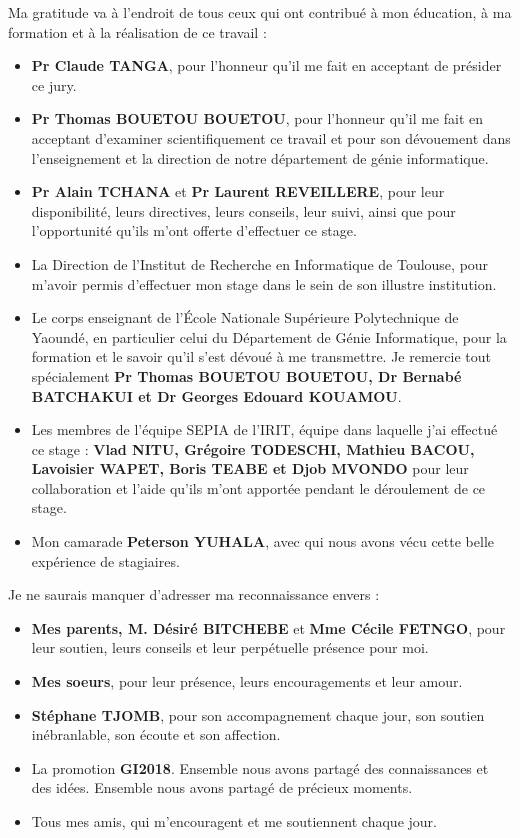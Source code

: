 \begin{SingleSpace}
Ma gratitude va à l'endroit de tous ceux qui ont contribué à mon éducation, à ma formation et à la réalisation de ce travail :

\begin{itemize}
	\item \textbf{Pr Claude TANGA}, pour l’honneur qu’il me fait en acceptant de présider ce jury.
    \item \textbf{Pr Thomas BOUETOU BOUETOU}, pour l’honneur qu’il me fait en acceptant d’examiner scientifiquement ce travail et pour son dévouement dans l'enseignement et la direction de notre département de génie informatique.
    \item \textbf{Pr Alain TCHANA} et \textbf{Pr Laurent REVEILLERE}, pour leur disponibilité, leurs directives, leurs conseils, leur suivi, ainsi que pour l’opportunité qu’ils m’ont offerte d’effectuer ce stage.
    \item La Direction de l’Institut de Recherche en Informatique de Toulouse, pour m’avoir permis d’effectuer mon stage dans le sein de son illustre institution.
    \item Le corps enseignant de l’École Nationale Supérieure Polytechnique de Yaoundé, en particulier celui du Département de Génie Informatique, pour la formation et le savoir qu’il s’est dévoué à me transmettre. Je remercie tout spécialement \textbf{Pr Thomas BOUETOU BOUETOU, Dr Bernabé BATCHAKUI et Dr Georges Edouard KOUAMOU}.
    \item Les membres de l’équipe SEPIA de l’IRIT, équipe dans laquelle j’ai effectué ce \break stage : \textbf{Vlad NITU, Grégoire TODESCHI, Mathieu BACOU, Lavoisier WAPET, Boris TEABE et Djob MVONDO} pour leur collaboration et l’aide qu’ils m’ont apportée pendant le déroulement de ce stage.
    \item Mon camarade \textbf{Peterson YUHALA}, avec qui nous avons vécu cette belle expérience de stagiaires.
\end{itemize}

\noindent Je ne saurais manquer d'adresser ma reconnaissance envers : 
\begin{itemize}
	\item \textbf{Mes parents, M. Désiré BITCHEBE} et \textbf{Mme Cécile FETNGO}, pour leur soutien, leurs conseils et leur perpétuelle présence pour moi.
	\item \textbf{Mes soeurs}, pour leur présence, leurs encouragements et leur amour.
    \item \textbf{Stéphane TJOMB}, pour son accompagnement chaque jour, son soutien inébranlable, son écoute et son affection.
    \item La promotion \textbf{GI2018}. Ensemble nous avons partagé des connaissances et des idées. Ensemble nous avons partagé de précieux moments. 
    \item Tous mes amis, qui m’encouragent et me soutiennent chaque jour.
\end{itemize}
\end{SingleSpace}
\clearpage

